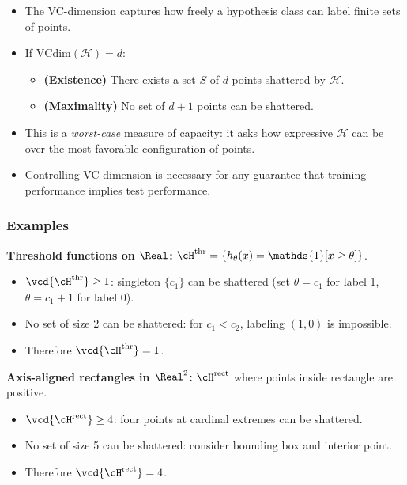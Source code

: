 \begin{itemize}
    \item The VC-dimension captures how freely a hypothesis class can label finite sets of points.
    \item If $\mathrm{VCdim}(\mathcal{H}) = d$:
    \begin{itemize}
        \item \textbf{(Existence)} There exists a set $S$ of $d$ points shattered by $\mathcal{H}$.
        \item \textbf{(Maximality)} No set of $d+1$ points can be shattered.
    \end{itemize}
    \item This is a \emph{worst-case} measure of capacity: it asks how expressive $\mathcal{H}$ can be over the most favorable configuration of points.
    \item Controlling VC-dimension is necessary for any guarantee that training performance implies test performance.
\end{itemize}

\subsubsection*{Examples}

\textbf{Threshold functions on $\Real$:} $\cH^{\text{thr}} = \{h_{\theta}(x)=\mathds{1}[x\geq\theta]\}$.
\begin{itemize}
    \item $\vcd{\cH^{\text{thr}}} \geq 1$: singleton $\{c_1\}$ can be shattered (set $\theta=c_1$ for label 1, $\theta=c_1+1$ for label 0).
    \item No set of size 2 can be shattered: for $c_1 < c_2$, labeling $(1,0)$ is impossible.
    \item Therefore $\vcd{\cH^{\text{thr}}} = 1$.
\end{itemize}

\textbf{Axis-aligned rectangles in $\Real^2$:} $\cH^{\text{rect}}$ where points inside rectangle are positive.
\begin{itemize}
    \item $\vcd{\cH^{\text{rect}}} \geq 4$: four points at cardinal extremes can be shattered.
    \item No set of size 5 can be shattered: consider bounding box and interior point.
    \item Therefore $\vcd{\cH^{\text{rect}}} = 4$.
\end{itemize}

